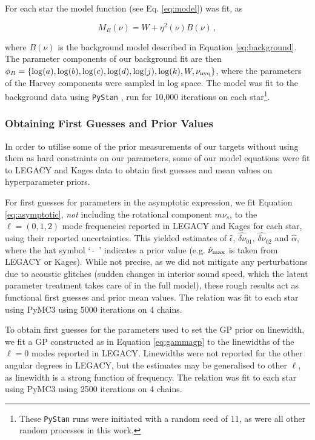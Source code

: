 \documentclass[12pt]{article}
\begin{document}
For each star the model function (see Eq. \ref{eq:model}) was fit, as

\begin{equation}
	M_{B}(\nu) = W + \eta^2(\nu)B(\nu)\, ,
\end{equation}

\noindent where $B(\nu)$ is the background model described in Equation \ref{eq:background}. The parameter components of our background fit are then $\phi_B = \{\log(a), \log(b), \log(c), \log(d), \log(j), \log(k), W, \nu_{\rm nyq}\}$, where the parameters of the Harvey components were sampled in log space. The model was fit to the background data using \texttt{PyStan} \cite{vanhoey+2013}, run for 10,000 iterations on each star\footnote{These \texttt{PyStan} runs were initiated with a random seed of 11, as were all other random processes in this work.}. 

\subsubsection{Obtaining First Guesses and Prior Values}
In order to utilise some of the prior measurements of our targets without using them as hard constraints on our parameters, some of our model equations were fit to LEGACY and Kages data to obtain first guesses and mean values on hyperparameter priors.

For first guesses for parameters in the asymptotic expression, we fit Equation \ref{eq:asymptotic}, \textit{not} including the rotational component $m\nu_s$, to the $\ell = (0, 1, 2)$ mode frequencies reported in LEGACY and Kages for each star, using their reported uncertainties. This yielded estimates of $\hat{\epsilon}$, $\widehat{\delta\nu}_{01}$, $\widehat{\delta\nu}_{02}$ and $\hat{\alpha}$, where the hat symbol `\, $\widehat{}$\, ' indicates a prior value (e.g. $\hat{\nu}_{\rm max}$ is taken from LEGACY or Kages). While not precise, as we did not mitigate any perturbations due to acoustic glitches (sudden changes in interior sound speed, which the latent parameter treatment takes care of in the full model), these rough results act as functional first guesses and prior mean values. The relation was fit to each star using PyMC3 \cite{salvatier+2016} using 5000 iterations on 4 chains.

To obtain first guesses for the parameters used to set the GP prior on linewidth, we fit a GP constructed as in Equation \ref{eq:gammagp} to the linewidths of the $\ell = 0$ modes reported in LEGACY. Linewidths were not reported for the other angular degrees in LEGACY, but the estimates may be generalised to other $\ell$, as linewidth is a strong function of frequency.  The relation was fit to each star using PyMC3 using 2500 iterations on 4 chains.
\end{document}
